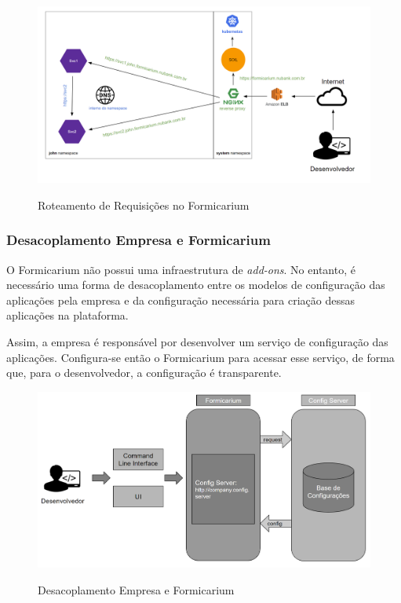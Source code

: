                 \begin{figure}[htb]
            	    \centering
            	    \caption{Roteamento de Requisições no Formicarium}
            	    \includegraphics[scale=0.32]{pictures/especificacao-de-projeto/fmc-routing.png}
            	    \label{fig:fmcrouting}
        	    \end{figure}
        	    
    	    \subsubsection{Desacoplamento Empresa e Formicarium}
    	        O Formicarium não possui uma infraestrutura de \textit{add-ons}. No entanto, é necessário uma forma de desacoplamento entre os modelos de configuração das aplicações pela empresa e da configuração necessária para criação dessas aplicações na plataforma.
    	        
    	        Assim, a empresa é responsável por desenvolver um serviço de configuração das aplicações. Configura-se então o Formicarium para acessar esse serviço, de forma que, para o desenvolvedor, a configuração é transparente.
    	        
    	        \begin{figure}[htb]
            	    \centering
            	    \caption{Desacoplamento Empresa e Formicarium}
            	    \includegraphics[scale=0.24]{pictures/especificacao-de-projeto/fmc-decoupling.png}
            	    \label{fig:fmcdecoupling}
        	    \end{figure}
        	    
